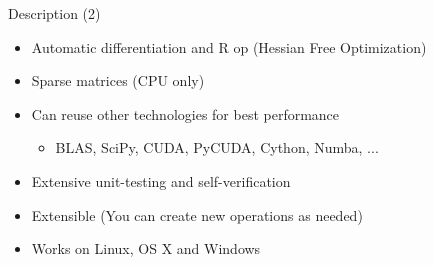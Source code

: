 \documentclass[utf8x,xcolor=pdftex,dvipsnames,table]{beamer}
\begin{document}
\begin{frame}{Description (2)}

  \begin{itemize}
    \item Automatic differentiation and R op (Hessian Free Optimization)
    \item Sparse matrices (CPU only)
    \item Can reuse other technologies for best performance
    \begin{itemize}
      \item BLAS, SciPy, CUDA, PyCUDA, Cython, Numba, ...
    \end{itemize}
    \item Extensive unit-testing and self-verification
    \item Extensible (You can create new operations as needed)
    \item Works on Linux, OS X and Windows
  \end{itemize}
\end{frame}








\end{document}
